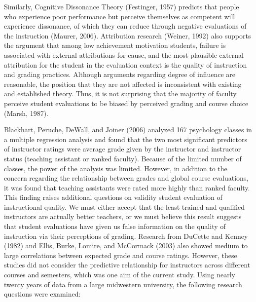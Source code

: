 \documentclass[,man]{apa6}
\theoremstyle{definition}
\theoremstyle{definition}
\theoremstyle{definition}
\theoremstyle{remark}
\begin{document}
Similarly, Cognitive Dissonance Theory (Festinger, 1957) predicts that
people who experience poor performance but perceive themselves as
competent will experience dissonance, of which they can reduce through
negative evaluations of the instruction (Maurer, 2006). Attribution
research (Weiner, 1992) also supports the argument that among low
achievement motivation students, failure is associated with external
attributions for cause, and the most plausible external attribution for
the student in the evaluation context is the quality of instruction and
grading practices. Although arguments regarding degree of influence are
reasonable, the position that they are not affected is inconsistent with
existing and established theory. Thus, it is not surprising that the
majority of faculty perceive student evaluations to be biased by
perceived grading and course choice (Marsh, 1987).

Blackhart, Peruche, DeWall, and Joiner (2006) analyzed 167 psychology
classes in a multiple regression analysis and found that the two most
significant predictors of instructor ratings were average grade given by
the instructor and instructor status (teaching assistant or ranked
faculty). Because of the limited number of classes, the power of the
analysis was limited. However, in addition to the concern regarding the
relationship between grades and global course evaluations, it was found
that teaching assistants were rated more highly than ranked faculty.
This finding raises additional questions on validity student evaluation
of instructional quality. We must either accept that the least trained
and qualified instructors are actually better teachers, or we must
believe this result suggests that student evaluations have given us
false information on the quality of instruction via their perceptions of
grading. Research from DuCette and Kenney (1982) and Ellis, Burke,
Lomire, and McCormack (2003) also showed medium to large correlations
between expected grade and course ratings. However, these studies did
not consider the predictive relationship for instructors across
different courses and semesters, which was one aim of the current study.
Using nearly twenty years of data from a large midwestern university,
the following research questions were examined:
\end{document}

